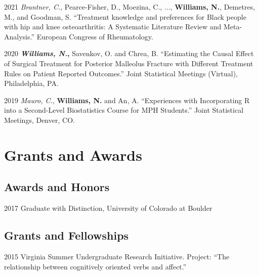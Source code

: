 \documentclass[12pt,letterpaper]{report}
\begin{document}
    \begin{tablist}
    
    \item[2021] \tab \textit{Brantner, C.}, Pearce-Fisher, D., Moezina, C., ..., \textbf{Williams, N.}, Demetres, M., and Goodman, S. \enquote{Treatment knowledge and preferences for Black people with hip and knee osteoarthritis: A Systematic Literature Review and Meta-Analysis.} European Congress of Rheumatology.
    
	\item[2020] \tab \textbf{\textit{Williams, N.},} Savenkov, O. and Chrea, B. \enquote{Estimating the Causal Effect of Surgical Treatment for Posterior Malleolus Fracture with Different Treatment Rules on Patient Reported Outcomes.} Joint Statistical Meetings (Virtual), Philadelphia, PA.
    
    	\item[2019] \tab \textit{Mauro, C.}, \textbf{Williams, N.} and An, A. \enquote{Experiences with Incorporating R into a Second-Level Biostatistics Course for MPH Students.} Joint Statistical Meetings, Denver, CO.

    \end{tablist}

    \section*{Grants and Awards}

    \subsection*{Awards and Honors}

    \begin{tablist}

        \item[2017] \tab Graduate with Distinction, University of Colorado at Boulder

    \end{tablist}

    \subsection*{Grants and Fellowships}

    \begin{tablist}

        \item[2015] \tab Virginia Summer Undergraduate Research Initiative. Project: \enquote{The relationship between cognitively oriented verbs and affect.}

    \end{tablist}
\end{document}
